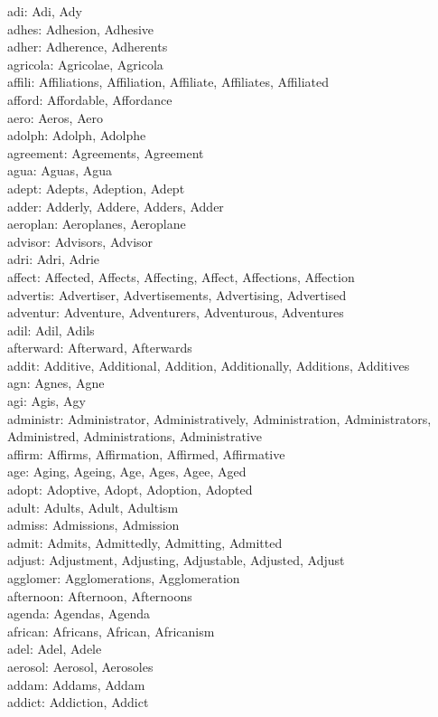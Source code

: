 adi: Adi, Ady\\
adhes: Adhesion, Adhesive\\
adher: Adherence, Adherents\\
agricola: Agricolae, Agricola\\
affili: Affiliations, Affiliation, Affiliate, Affiliates, Affiliated\\
afford: Affordable, Affordance\\
aero: Aeros, Aero\\
adolph: Adolph, Adolphe\\
agreement: Agreements, Agreement\\
agua: Aguas, Agua\\
adept: Adepts, Adeption, Adept\\
adder: Adderly, Addere, Adders, Adder\\
aeroplan: Aeroplanes, Aeroplane\\
advisor: Advisors, Advisor\\
adri: Adri, Adrie\\
affect: Affected, Affects, Affecting, Affect, Affections, Affection\\
advertis: Advertiser, Advertisements, Advertising, Advertised\\
adventur: Adventure, Adventurers, Adventurous, Adventures\\
adil: Adil, Adils\\
afterward: Afterward, Afterwards\\
addit: Additive, Additional, Addition, Additionally, Additions, Additives\\
agn: Agnes, Agne\\
agi: Agis, Agy\\
administr: Administrator, Administratively, Administration, Administrators, Administred, Administrations, Administrative\\
affirm: Affirms, Affirmation, Affirmed, Affirmative\\
age: Aging, Ageing, Age, Ages, Agee, Aged\\
adopt: Adoptive, Adopt, Adoption, Adopted\\
adult: Adults, Adult, Adultism\\
admiss: Admissions, Admission\\
admit: Admits, Admittedly, Admitting, Admitted\\
adjust: Adjustment, Adjusting, Adjustable, Adjusted, Adjust\\
agglomer: Agglomerations, Agglomeration\\
afternoon: Afternoon, Afternoons\\
agenda: Agendas, Agenda\\
african: Africans, African, Africanism\\
adel: Adel, Adele\\
aerosol: Aerosol, Aerosoles\\
addam: Addams, Addam\\
addict: Addiction, Addict\\



